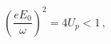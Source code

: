 \begin{equation}
\left( \frac{eE_{0}}{\omega }\right) ^{2}=4U_{p}<1\,,  \label{Dipole}
\end{equation}

